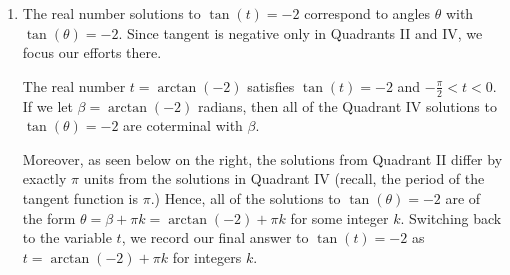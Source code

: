 \documentclass{ximera}
\begin{document}
\begin{example}
\begin{explanation}
\begin{enumerate}
\begin{image}
\end{image}


\item The real number solutions to $\tan(t)=-2$  correspond to angles $\theta$  with $\tan(\theta) = -2$.  Since tangent is negative only in Quadrants II and IV, we focus our efforts there. 

 

The real number $t = \arctan(-2)$ satisfies $\tan(t)=-2$  and $-\frac{\pi}{2} < t < 0$.   If we let $\beta = \arctan(-2)$ radians, then all of the Quadrant IV solutions to  $\tan(\theta) = -2$  are coterminal with $\beta$. 

 

Moreover, as seen below on the right, the solutions from Quadrant II differ by exactly $\pi$ units from the solutions in Quadrant IV (recall, the period  of the tangent function is $\pi$.)  Hence, all of the  solutions to $\tan(\theta) = -2$ are of the form $\theta = \beta + \pi k = \arctan(-2) + \pi k$ for some integer $k$.   Switching back to the variable $t$,  we record our final answer to $\tan(t) = -2$ as $t = \arctan(-2) + \pi k$ for integers $k$.


\begin{image}
\end{image}
\end{enumerate}
\end{explanation}
\end{example}
\end{document}
